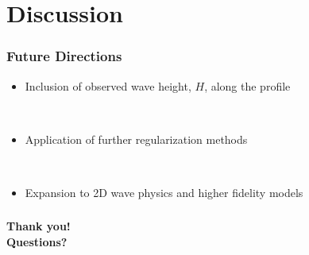 \documentclass[7pt]{beamer}
\begin{document}
\section{Discussion}

\begin{frame}
	\frametitle{Future Directions}
		\begin{itemize}
			 \item Inclusion of observed wave height, $H$, along the profile
		\end{itemize}
		$\,$\\
		\begin{itemize}
			 \item Application of further regularization methods
		\end{itemize}
		$\,$\\
		\begin{itemize}
			 \item Expansion to 2D wave physics and higher fidelity models
 		\end{itemize}
\end{frame}

\begin{frame}
	\frametitle{}
		\hspace{2.5cm}
		\begin{minipage}{50mm}   
                 	\begin{alertblock}{}    
                        		 \begin{center}
                  			\textbf{Thank you! \\Questions?}
                            	 \end{center}
      			\end{alertblock}
		\end{minipage}
\end{frame}
\end{document}
